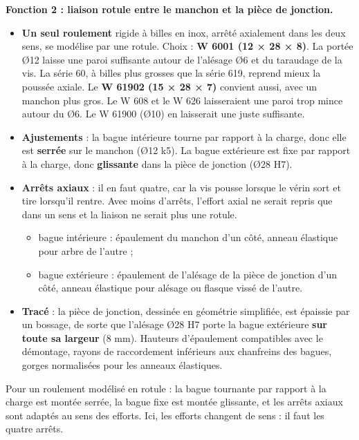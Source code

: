 \documentclass[11pt,a4paper]{article}
\providecommand{\tightlist}{\setlength{\itemsep}{0pt}\setlength{\parskip}{0pt}}
\begin{document}
\textbf{Fonction 2 : liaison rotule entre le manchon et la pièce de jonction.}

\begin{itemize}
\tightlist
\item
  \textbf{Un seul roulement} rigide à billes en inox, arrêté axialement dans les deux sens, se modélise par une rotule. Choix : \textbf{W 6001 (12 × 28 × 8)}. La portée Ø12 laisse une paroi suffisante autour de l'alésage Ø6 et du taraudage de la vis. La série 60, à billes plus grosses que la série 619, reprend mieux la poussée axiale. Le \textbf{W 61902 (15 × 28 × 7)} convient aussi, avec un manchon plus gros. Le W 608 et le W 626 laisseraient une paroi trop mince autour du Ø6. Le W 61900 (Ø10) en laisserait une juste suffisante.
\item
  \textbf{Ajustements} : la bague intérieure tourne par rapport à la charge, donc elle est \textbf{serrée} sur le manchon (Ø12 k5). La bague extérieure est fixe par rapport à la charge, donc \textbf{glissante} dans la pièce de jonction (Ø28 H7).
\item
  \textbf{Arrêts axiaux} : il en faut quatre, car la vis pousse lorsque le vérin sort et tire lorsqu'il rentre. Avec moins d'arrêts, l'effort axial ne serait repris que dans un sens et la liaison ne serait plus une rotule.

  \begin{itemize}
  \tightlist
  \item
    bague intérieure : épaulement du manchon d'un côté, anneau élastique pour arbre de l'autre ;
  \item
    bague extérieure : épaulement de l'alésage de la pièce de jonction d'un côté, anneau élastique pour alésage ou flasque vissé de l'autre.
  \end{itemize}
\item
  \textbf{Tracé} : la pièce de jonction, dessinée en géométrie simplifiée, est épaissie par un bossage, de sorte que l'alésage Ø28 H7 porte la bague extérieure \textbf{sur toute sa largeur} (8 mm). Hauteurs d'épaulement compatibles avec le démontage, rayons de raccordement inférieurs aux chanfreins des bagues, gorges normalisées pour les anneaux élastiques.
\end{itemize}

\begin{methode}

Pour un roulement modélisé en rotule : la bague tournante par rapport à la charge est montée serrée, la bague fixe est montée glissante, et les arrêts axiaux sont adaptés au sens des efforts. Ici, les efforts changent de sens : il faut les quatre arrêts.

\end{methode}
\end{document}
